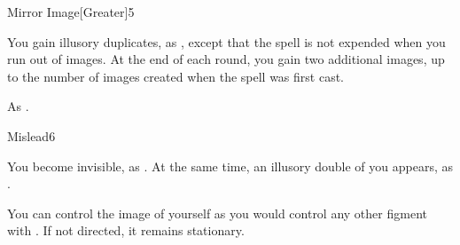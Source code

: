 \begin{spellsection}{Mirror Image}[Greater]{5}
    \begin{spellheader}
    \end{spellheader}
    \begin{spellcontent}
        \begin{spelltargetinginfo}
        \end{spelltargetinginfo}
        \begin{spelleffects}
            \spelleffect You gain illusory duplicates, as , except that the spell is not expended when you run out of images. At the end of each round, you gain two additional images, up to the number of images created when the spell was first cast.
            \spelldur \durshort \dismissable
        \end{spelleffects}
    \end{spellcontent}
    \begin{spellfooter}
        \spellnotes As .
        \miscastexplode
    \end{spellfooter}
\end{spellsection}

\begin{spellsection}{Mislead}{6}
    \begin{spellheader}
    \end{spellheader}
    \begin{spellcontent}
        \begin{spelltargetinginfo}
        \end{spelltargetinginfo}
        \begin{spelleffects}
            \spelleffect You become invisible, as . At the same time, an illusory double of you appears, as .

            You can control the image of yourself as you would control any other figment with . If not directed, it remains stationary.
            \spelldur \durshort \dismissable
        \end{spelleffects}
    \end{spellcontent}
    \begin{spellfooter}
        \miscastexplode
    \end{spellfooter}
\end{spellsection}


